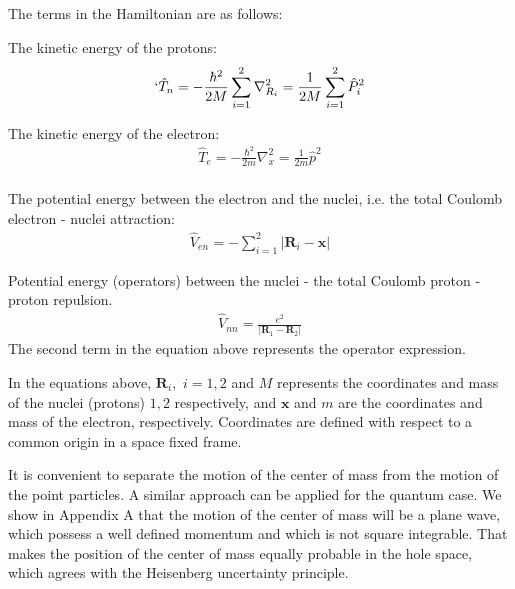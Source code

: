 The terms in the Hamiltonian are as follows:

The kinetic energy of the protons:
\begin{equation}`
\begin{split}
 \hat{T}_n = - \frac{\hbar^2}{2M}\sum_{i=1}^2{\nabla_{R_i}^2 } = \frac{1}{2M}\sum_{i=1}^2{\hat{P}_i^2 }
\end{split}
\end{equation}

The kinetic energy of the electron:
\begin{equation}
\begin{split}
 \hat{T}_e= -\frac{\hbar^2}{2m}\nabla_{x}^2 = \frac{1}{2m}\hat{p}^2  \\[.8em]
\end{split}
\end{equation}

The potential energy between the electron and the nuclei, i.e. the total Coulomb electron - nuclei attraction:
\begin{equation}
\begin{split}
 \hat{V}_{en} = -\sum_{i=1}^2{\left|\mathbf{R}_i - \mathbf{x}\right| }   
\end{split}
\end{equation}

Potential energy (operators) between the nuclei - the total Coulomb proton - proton repulsion. 
\begin{equation}
\begin{split}
 \hat{V}_{nn} =  \frac{e^2}{\left|\mathbf{R}_1 - \mathbf{R}_2\right| } 
\end{split}
\end{equation}
The second term in the equation above represents the operator expression.

In the equations above, $ \mathbf{R}_i,\,\, i = 1,2 $ and $ M $ represents the coordinates and mass of the nuclei (protons) $1,2$ respectively, and $ \mathbf{x} $ and $ m $ are the coordinates and mass of the electron, respectively. Coordinates are defined with respect to a common origin in a space fixed frame.

It is convenient to separate the motion of the center of mass from the motion of the point particles. A similar approach can be applied for the quantum case. We show in Appendix A that the motion of the center of mass will be a plane wave, which possess a well defined momentum and which is not square integrable. That makes the position of the center of mass equally probable in the hole space, which agrees with the Heisenberg uncertainty principle.

